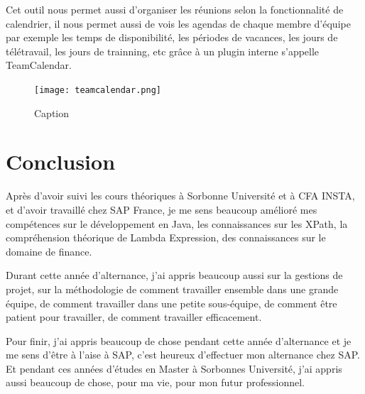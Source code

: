     \par Cet outil nous permet aussi d'organiser les réunions selon la fonctionnalité de calendrier, il nous permet aussi de vois les agendas de chaque membre d'équipe par exemple les temps de disponibilité, les périodes de vacances, les jours de télétravail, les jours de trainning, etc grâce à un plugin interne s'appelle TeamCalendar.
    \begin{figure}[H]
    	\centering
    	\texttt{[image: teamcalendar.png]}
    	\caption{Caption}
    	\label{fig:teamCalendar_label}
    \end{figure}
    
\newpage
\section{Conclusion}
Après d'avoir suivi les cours théoriques à Sorbonne Université et à CFA INSTA, et d'avoir travaillé chez SAP France, je me sens beaucoup amélioré mes compétences sur le développement en Java, les connaissances sur les XPath, la compréhension théorique de Lambda Expression, des connaissances sur le domaine de finance.

\par Durant cette année d'alternance, j'ai appris beaucoup aussi sur la gestions de projet, sur la méthodologie de comment travailler ensemble dans une grande équipe, de comment travailler dans une petite sous-équipe, de comment être patient pour travailler, de comment travailler efficacement.

\par Pour finir, j'ai appris beaucoup de chose pendant cette année d'alternance et je me sens d'être à l'aise à SAP, c'est heureux d'effectuer mon alternance chez SAP. Et pendant ces années d'études en Master à Sorbonnes Université, j'ai appris aussi beaucoup de chose, pour ma vie, pour mon futur professionnel.


\newpage

